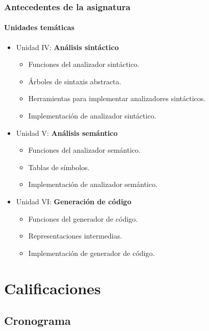 \documentclass{beamer}
\begin{document}
        \begin{frame}
            \frametitle{Antecedentes de la asignatura}
            \framesubtitle{Unidades tem\'aticas}

            \begin{itemize}
                \item Unidad IV: \textbf{An\'alisis sint\'actico}
                \begin{itemize}
                    \item Funciones del analizador sint\'actico.
                    \item \'Arboles de sintaxis abstracta.
                    \item Herramientas para implementar analizadores sint\'acticos.
                    \item Implementaci\'on de analizador sint\'actico.
                \end{itemize}
                \item Unidad V: \textbf{An\'alisis sem\'antico}
                \begin{itemize}
                    \item Funciones del analizador sem\'antico.
                    \item Tablas de s\'imbolos.
                    \item Implementaci\'on de analizador sem\'antico.
                \end{itemize}
                \item Unidad VI: \textbf{Generaci\'on de c\'odigo}
                \begin{itemize}
                    \item Funciones del generador de c\'odigo.
                    \item Representaciones intermedias.
                    \item Implementaci\'on de generador de c\'odigo.
                \end{itemize}
            \end{itemize}
        \end{frame}

    \section{Calificaciones}

        \subsection{Cronograma}
\end{document}
